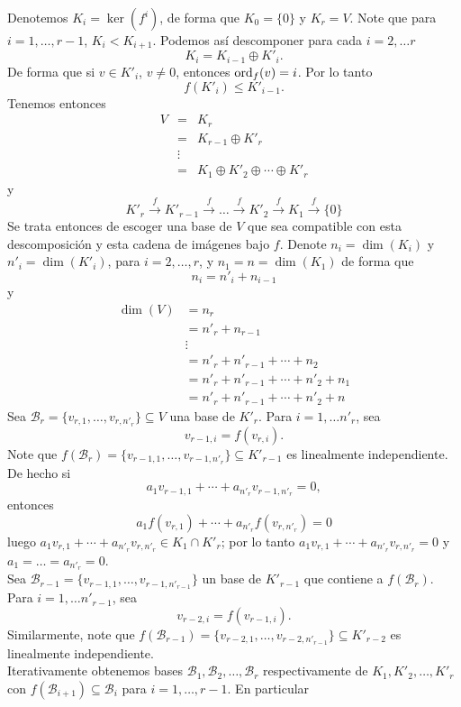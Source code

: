 \dem
Denotemos $K_i=\ker(f^i)$, de forma que $K_0=\{0\}$ y $K_r=V$. Note que para $i=1,\ldots,r-1$, $K_i<K_{i+1}$. Podemos as\'i descomponer para cada $i=2,\ldots r$
\[
K_i=K_{i-1}\oplus K'_i.
\]
De forma que si $v\in K'_i$, $v\ne 0$, entonces $\operatorname{ord}_f(v)=i$. Por lo tanto
\[
f\left(K'_i\right)\le K'_{i-1}.
\]
Tenemos entonces
\begin{eqnarray*}
V & = & K_r\\
   & = & K_{r-1}\oplus K'_r\\
   & \vdots &\\
   & = & K_1\oplus K'_2\oplus\cdots\oplus K'_r
\end{eqnarray*}
y
\[
K'_r\overset{f}\longrightarrow K'_{r-1}\overset{f}\longrightarrow\ldots\overset{f}\longrightarrow K'_2\overset{f}\longrightarrow K_1\overset{f}\longrightarrow \{0\}
\]
Se trata entonces de escoger una base de $V$ que sea compatible con esta descomposici\'on y esta cadena de im\'agenes bajo $f$. Denote $n_i=\dim(K_i)$ y $n'_i=\dim(K'_i)$, para $i=2,\ldots,r$, y $n_1=n=\dim(K_1)$ de forma que
$$n_i=n'_i+n_{i-1}$$
y
\begin{align*}
\dim(V)& =n_r\\
 & =n'_r+n_{r-1}\\
 & \vdots\\
 & =n'_r+n'_{r-1}+\cdots+n_2\\
 & =n'_r+n'_{r-1}+\cdots+n'_2+n_1\\
 & =n'_r+n'_{r-1}+\cdots+n'_2+n
\end{align*}
Sea $\mathcal{B}_r=\{v_{r,1},\ldots,v_{r,n'_r}\}\subseteq V$ una base de $K'_r$. Para $i=1,\ldots n'_r$, sea $$v_{r-1,i}=f(v_{r,i}).$$ Note que $f(\mathcal{B}_r)=\{v_{r-1,1},\ldots,v_{r-1,n'_r}\}\subseteq K'_{r-1}$ es linealmente independiente. De hecho si
\[
a_1v_{r-1,1}+\cdots+a_{n'_r}v_{r-1,n'_r}=0,
\]
entonces
\[
a_1f(v_{r,1})+\cdots+a_{n'_r}f(v_{r,n'_r})=0
\]
luego $a_1v_{r,1}+\cdots+a_{n'_r}v_{r,n'_r}\in K_1\cap K'_r$; por lo tanto $a_1v_{r,1}+\cdots+a_{n'_r}v_{r,n'_r}=0$ y $a_1=\ldots=a_{n'_r}=0$.\\
Sea $\mathcal{B}_{r-1}=\{v_{r-1,1},\ldots,v_{r-1,n'_{r-1}}\}$ un base de $K'_{r-1}$ que contiene a $f(\mathcal{B}_r)$. Para $i=1,\ldots n'_{r-1}$, sea $$v_{r-2,i}=f(v_{r-1,i}).$$ Similarmente, note que $f(\mathcal{B}_{r-1})=\{v_{r-2,1},\ldots,v_{r-2,n'_{r-1}}\}\subseteq K'_{r-2}$ es linealmente independiente.\\
Iterativamente obtenemos bases $\mathcal{B}_1,\mathcal{B}_2,\ldots,\mathcal{B}_r$ respectivamente de $K_1,K'_2,\ldots,K'_r$ con $f(\mathcal{B}_{i+1})\subseteq\mathcal{B}_i$ para $i=1,\ldots,r-1$. En particular

